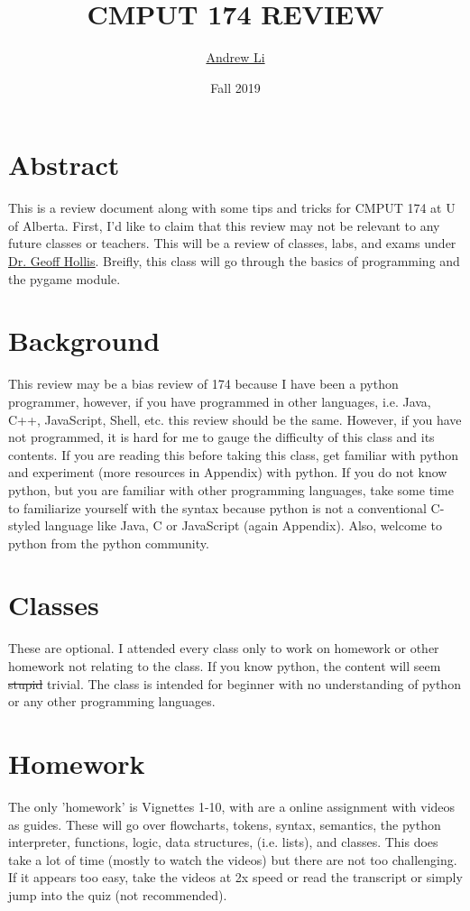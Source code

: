 \documentclass[12pt]{article}
\title{CMPUT 174 REVIEW}
\author{\href{https://github.com/Zeyu-Li}{Andrew Li}}
\date{Fall 2019}
\begin{document}
\maketitle

\section{Abstract}
This is a review document along with some tips and tricks for CMPUT 174 at U of Alberta. First, I'd like to claim that this review may not be relevant to any future classes or teachers. This will be a review of classes, labs, and exams under  \underline{\href{run:https://sites.ualberta.ca/~hollis/}{Dr. Geoff Hollis}}. Breifly, this class will go through the basics of programming and the pygame module. 

\section{Background}
This review may be a bias review of 174 because I have been a python programmer, however, if you have programmed in other languages, i.e. Java, C++, JavaScript, Shell, etc. this review should be the same. However, if you have not programmed, it is hard for me to gauge the difficulty of this class and its contents. If you are reading this before taking this class, get familiar with python and experiment (more resources in Appendix) with python. If you do not know python, but you are familiar with other programming languages, take some time to familiarize yourself with the syntax because python is not a conventional C-styled language like Java, C or JavaScript (again Appendix). Also, welcome to python from the python community. 

\section{Classes}
These are optional. I attended every class only to work on homework or other homework not relating to the class. If you know python, the content will seem \sout{stupid} trivial. The class is intended for beginner with no understanding of python or any other programming languages. 

\section{Homework}
The only 'homework' is Vignettes 1-10, with are a online assignment with videos as guides. These will go over flowcharts, tokens, syntax, semantics, the python interpreter, functions, logic, data structures, (i.e. lists), and classes. This does take a lot of time (mostly to watch the videos) but there are not too challenging. If it appears too easy, take the videos at 2x speed or read the transcript or simply jump into the quiz (not recommended). 
\end{document}

